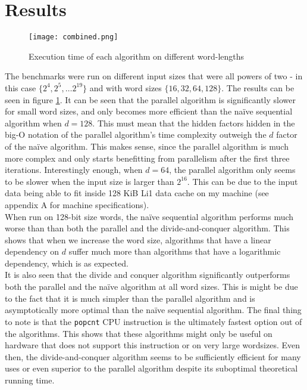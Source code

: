 \section{Results}
\begin{figure}
    \centering
    \texttt{[image: combined.png]}
    \caption{Execution time of each algorithm on different word-lengths}
    \label{fig:runningtime}
\end{figure}
The benchmarks were run on different input sizes that were all powers of two - in this case $\{2^4, 2^5, \dots 2^{19}\}$ and with word sizes $\{16, 32, 64, 128\}$. The results can be seen in figure \ref{fig:runningtime}. 
It can be seen that the parallel algorithm is significantly slower for small word sizes, and only becomes more efficient than the naïve sequential algorithm when $d=128$. This must mean that the hidden factors hidden in the big-O notation of the parallel algorithm's time complexity outweigh the $d$ factor of the naïve algorithm. This makes sense, since the parallel algorithm is much more complex and only starts benefitting from parallelism after the first three iterations. Interestingly enough, when $d=64$, the parallel algorithm only seems to be slower when the input size is larger than $2^{16}$. This can be due to the input data being able to fit inside 128 KiB Li1 data cache on my machine (see appendix A for machine specifications).\\
When run on 128-bit size words, the naïve sequential algorithm performs much worse than than both the parallel and the divide-and-conquer algorithm. This shows that when we increase the word size, algorithms that have a linear dependency on $d$ suffer much more than algorithms that have a logarithmic dependency, which is as expected.\\
It is also seen that the divide and conquer algorithm significantly outperforms both the parallel and the naïve algorithm at all word sizes. This is might be due to the fact that it is much simpler than the parallel algorithm and is asymptotically more optimal than the naïve sequential algorithm.
The final thing to note is that the \texttt{popcnt} CPU instruction is the ultimately fastest option out of the algorithms. This shows that these algorithms might only be useful on hardware that does not support this instruction or on very large wordsizes. Even then, the divide-and-conquer algorithm seems to be sufficiently efficient for many uses or even superior to the parallel algorithm despite its suboptimal theoretical running time.\\

